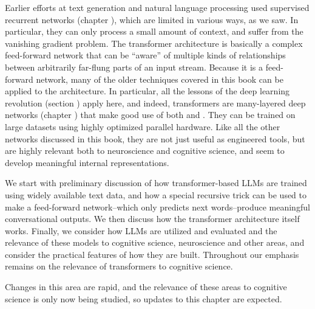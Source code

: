 
Earlier efforts at text generation and natural language processing used
supervised recurrent networks (chapter ), which
are limited in various ways, as we saw. In particular, they can only process a
small amount of context, and suffer from the vanishing gradient problem. The
transformer architecture is basically a complex feed-forward network that can
be ``aware'' of multiple kinds of relationships between arbitrarily far-flung
parts of an input stream. Because it is a feed-forward network, many of the
older techniques covered in this book can be applied to the architecture. In
particular, all the lessons of the deep learning revolution (section
) apply here, and indeed, transformers are many-layered
deep networks (chapter ) that make good use of both
 and . They
can be trained on large datasets using highly optimized parallel hardware. Like
all the other networks discussed in this book, they are not just useful as
engineered tools, but are highly relevant both to neuroscience and cognitive
science, and seem to develop meaningful internal representations. 

We start with preliminary discussion of how transformer-based LLMs are trained
using widely available text data, and how a special recursive trick can be used
to make a feed-forward network--which only predicts next words--produce
meaningful conversational outputs. We then discuss how the transformer
architecture itself works. Finally, we consider how LLMs are utilized and
evaluated and the relevance of these models to cognitive science, neuroscience
and other areas, and consider the practical features of how they are built.
Throughout our emphasis remains on the relevance of transformers to cognitive
science.

Changes in this area are rapid, and the relevance of these areas to cognitive
science is only now being studied, so updates to this chapter are expected.

